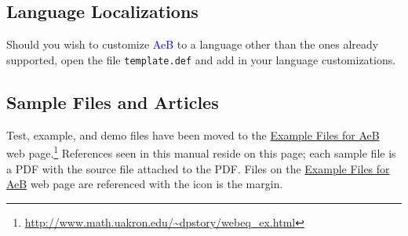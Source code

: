 \documentclass{article}
\def\AEB{\textsf{AeB}}
\def\cAEB{\textcolor{blue}{\AEB}}
\def\bUrl{http://www.math.uakron.edu/~dpstory}
\def\AEB{\textsf{AeB}}
\def\dps{$\mbox{$\mathfrak D$\kern-.3em\mbox{$\mathfrak P$}%
   \kern-.6em \hbox{$\mathcal S$}}$}
\def\dps{$\mbox{$\mathfrak D$\kern-.3em\mbox{$\mathfrak P$}%
   \kern-.6em \hbox{$\mathcal S$}}$}
\begin{document}
\subsection{Language Localizations}

Should you wish to customize {\cAEB} to a language other than the ones
already supported, open the file \texttt{template.def} and add in your
language customizations.



\subsection{Sample Files and Articles}\label{s:samplefiles}

Test, example, and demo files have been moved to the \href{\bUrl/webeq_ex.html}{Example Files for
AeB} web page.\footnote{\url{\bUrl/webeq_ex.html}} References seen in this manual reside on this page; each
sample file is a PDF with the source file attached to the PDF. Files on
the \href{\bUrl/webeq_ex.html}{Example Files for AeB} web page are
referenced with the icon  is the margin.
\end{document}
